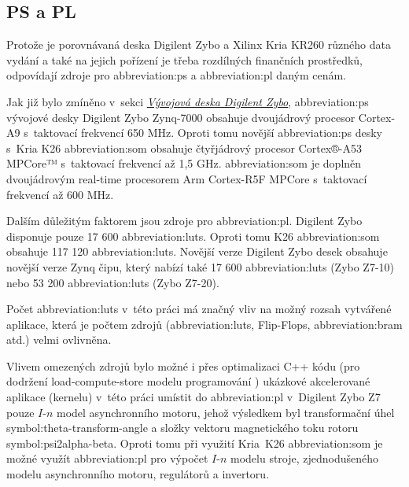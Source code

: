 \documentclass[a4paper, twoside, 11pt]{article}
\begin{document}
			\subsection{PS a PL}\label{subsec:ps-a-pl}
					Protože je porovnávaná deska Digilent Zybo a Xilinx Kria KR260 různého data vydání a také na jejich pořízení je třeba rozdílných finančních prostředků, odpovídají zdroje pro \gls{abbreviation:ps} a \gls{abbreviation:pl} daným cenám.\par
					Jak již bylo zmíněno v~sekci \hyperref[sec:vyvojova-deska-digilent-zybo]{\textit{Vývojová deska Digilent Zybo}}, \gls{abbreviation:ps} vývojové desky Digilent Zybo Zynq-7000 obsahuje dvoujádrový procesor Cortex-A9 s~taktovací frekvencí 650 MHz. Oproti tomu novější \gls{abbreviation:ps} desky s~Kria K26 \gls{abbreviation:som} obsahuje čtyřjádrový procesor Cortex®-A53 MPCore™ s~taktovací frekvencí až 1,5 GHz. \gls{abbreviation:som} je doplněn dvoujádrovým real-time procesorem Arm Cortex-R5F MPCore s~taktovací frekvencí až 600 MHz. \cite{digilent-zybo-reference-manual} \cite{kria-k26-som-ds}\par
					Dalším důležitým faktorem jsou zdroje pro \gls{abbreviation:pl}. Digilent Zybo disponuje pouze 17 600 \gls{abbreviation:luts}. Oproti tomu K26 \gls{abbreviation:som} obsahuje 117 120 \gls{abbreviation:luts}. Novější verze Digilent Zybo desek obsahuje novější verze Zynq čipu, který nabízí také 17 600 \gls{abbreviation:luts} (Zybo Z7-10) nebo 53 200 \gls{abbreviation:luts} (Zybo Z7-20). \cite{digilent-zybo-reference-manual} \cite{kria-k26-som-ds}\par
					Počet \gls{abbreviation:luts} v~této práci má značný vliv na možný rozsah vytvářené aplikace, která je počtem zdrojů (\gls{abbreviation:luts}, Flip-Flops, \gls{abbreviation:bram} atd.) velmi ovlivněna.\par
					Vlivem omezených zdrojů bylo možné i přes optimalizaci C++ kódu (pro dodržení load-compute-store modelu programování \cite{vitis-unified-software-platform-documentation-2022}) ukázkové akcelerované aplikace (kernelu) v~této práci umístit do \gls{abbreviation:pl} v~Digilent Zybo Z7 pouze $I$-$n$ model asynchronního motoru, jehož výsledkem byl transformační úhel \gls{symbol:theta-transform-angle} a složky vektoru magnetického toku rotoru \gls{symbol:psi2alpha-beta}. Oproti tomu při využití Kria~K26 \gls{abbreviation:som} je možné využít \gls{abbreviation:pl} pro výpočet $I$-$n$ modelu stroje, zjednodušeného modelu asynchronního motoru, regulátorů a invertoru.
\end{document}
